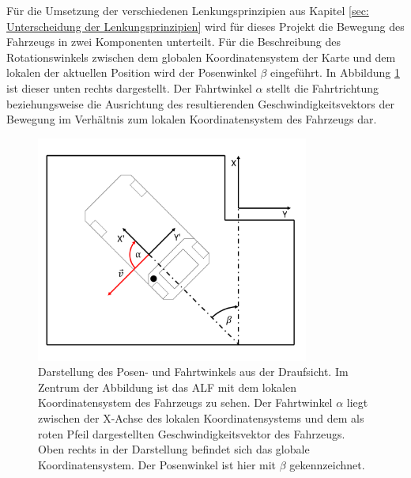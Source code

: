 		
		Für die Umsetzung der verschiedenen Lenkungsprinzipien aus Kapitel \ref{sec: Unterscheidung der Lenkungsprinzipien} wird für dieses Projekt die Bewegung des Fahrzeugs in zwei Komponenten unterteilt. Für die Beschreibung des Rotationswinkels zwischen dem globalen Koordinatensystem der Karte und dem lokalen der aktuellen Position wird der Posenwinkel $\beta$ eingeführt. In Abbildung \ref{fig: Posen- und Fahrtwinkel} ist dieser unten rechts dargestellt. Der Fahrtwinkel $\alpha$ stellt die Fahrtrichtung beziehungsweise die Ausrichtung des resultierenden Geschwindigkeitsvektors der Bewegung im Verhältnis zum lokalen Koordinatensystem des Fahrzeugs dar. 
		
		\begin{figure}[H]
			\centering
			\includegraphics[width=0.8\textwidth]{Bilder/posenundfahrtwinkel.png}
			\caption{Darstellung des Posen- und Fahrtwinkels aus der Draufsicht. Im Zentrum der Abbildung ist das ALF mit dem lokalen Koordinatensystem des Fahrzeugs zu sehen. Der Fahrtwinkel $\alpha$ liegt zwischen der X-Achse des lokalen Koordinatensystems und dem als roten Pfeil dargestellten Geschwindigkeitsvektor des Fahrzeugs. Oben rechts in der Darstellung befindet sich das globale Koordinatensystem. Der Posenwinkel ist hier mit $\beta$ gekennzeichnet.}
			\label{fig: Posen- und Fahrtwinkel}
		\end{figure}
		
